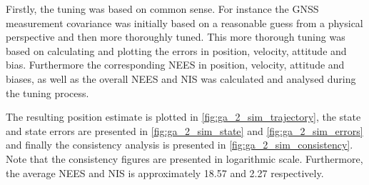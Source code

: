 Firstly, the tuning was based on common sense. For instance the GNSS measurement covariance was initially based on a reasonable guess from a physical perspective and then more thoroughly tuned. This more thorough tuning was based on calculating and plotting the errors in position, velocity, attitude and bias. Furthermore the corresponding NEES in position, velocity, attitude and biases, as well as the overall NEES and NIS was calculated and analysed during the tuning process. 

The resulting position estimate is plotted in \cref{fig:ga_2_sim_trajectory}, the state and state errors are presented in \cref{fig:ga_2_sim_state} and \cref{fig:ga_2_sim_errors} and finally the consistency analysis is presented in \cref{fig:ga_2_sim_consistency}. Note that the consistency figures are presented in logarithmic scale. Furthermore, the average NEES and NIS is approximately 18.57 and 2.27 respectively.

